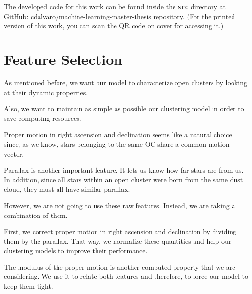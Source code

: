 \documentclass[11pt, a4paper, english]{book}
\begin{document}
The developed code for this work can be found inside the \verb|src| directory at GitHub:
\href{https://github.com/cdalvaro/machine-learning-master-thesis}{cdalvaro/machine-learning-master-thesis} repository.
(For the printed version of this work, you can scan the QR code on cover for accessing it.)

\section{Feature Selection}
\label{sec:feature_selection}

As mentioned before, we want our model to characterize open clusters by looking at their dynamic properties.

Also, we want to maintain as simple as possible our clustering model in order to save computing resources.

Proper motion in right ascension and declination seems like a natural choice since, as we know,
stars belonging to the same OC share a common motion vector.

Parallax is another important feature. It lets us know how far stars are from us.
In addition, since all stars within an open cluster were born from the same dust cloud,
they must all have similar parallax.

However, we are not going to use these raw features.
Instead, we are taking a combination of them.

First, we correct proper motion in right ascension and declination by dividing them by the parallax.
That way, we normalize these quantities and help our clustering models to improve their performance.

The modulus of the proper motion is another computed property that we are considering.
We use it to relate both features and therefore, to force our model to keep them tight.
\end{document}
